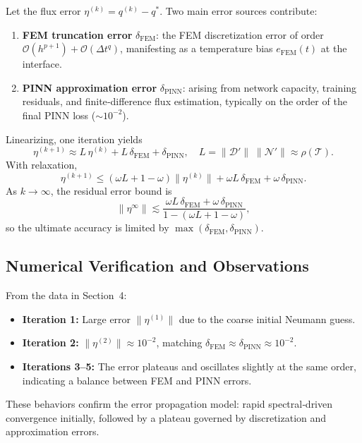 \documentclass[12pt]{article}
\begin{document}
Let the flux error \(\eta^{(k)} = q^{(k)} - q^*\).  Two main error sources contribute:
\begin{enumerate}
  \item \textbf{FEM truncation error} \(\delta_{\mathrm{FEM}}\): the FEM discretization error of order \(\mathcal{O}(h^{p+1}) + \mathcal{O}(\Delta t^q)\), manifesting as a temperature bias \(e_{\mathrm{FEM}}(t)\) at the interface.
  \item \textbf{PINN approximation error} \(\delta_{\mathrm{PINN}}\): arising from network capacity, training residuals, and finite‐difference flux estimation, typically on the order of the final PINN loss (\(\sim10^{-2}\)).
\end{enumerate}
Linearizing, one iteration yields\cite{gander_schwarz_2008}
\begin{equation}
  \eta^{(k+1)}
  \approx L\,\eta^{(k)}
    + L\,\delta_{\mathrm{FEM}}
    + \delta_{\mathrm{PINN}},
  \quad L = \|\mathcal{D}'\|\;\|\mathcal{N}'\|\approx\rho(\mathcal{T}).
\end{equation}
With relaxation,
\begin{equation}
  \eta^{(k+1)}
  \le (\omega L + 1-\omega)\|\eta^{(k)}\|
     + \omega L\,\delta_{\mathrm{FEM}}
     + \omega\,\delta_{\mathrm{PINN}}.
\end{equation}
As \(k\to\infty\), the residual error bound is
\begin{equation}
  \|\eta^\infty\|
  \lesssim
  \frac{\omega L\,\delta_{\mathrm{FEM}}
        + \omega\,\delta_{\mathrm{PINN}}}
       {1 - (\omega L + 1-\omega)},
\end{equation}
so the ultimate accuracy is limited by \(\max(\delta_{\mathrm{FEM}}, \delta_{\mathrm{PINN}})\).

\subsection{Numerical Verification and Observations}

From the data in Section~4:
\begin{itemize}
  \item \textbf{Iteration 1:} Large error \(\|\eta^{(1)}\|\) due to the coarse initial Neumann guess.
  \item \textbf{Iteration 2:} \(\|\eta^{(2)}\|\approx10^{-2}\), matching \(\delta_{\mathrm{FEM}}\approx\delta_{\mathrm{PINN}}\approx10^{-2}\).
  \item \textbf{Iterations 3–5:} The error plateaus and oscillates slightly at the same order, indicating a balance between FEM and PINN errors.
\end{itemize}
These behaviors confirm the error propagation model: rapid spectral‐driven convergence initially, followed by a plateau governed by discretization and approximation errors.
\end{document}
